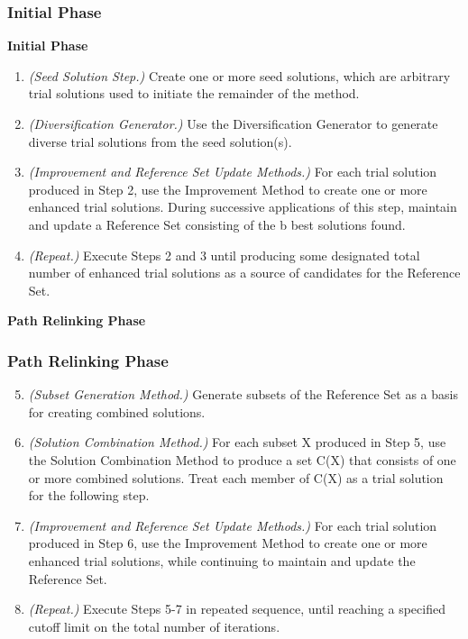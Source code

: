 \subsubsection{Initial Phase}
\textbf{Initial Phase}
\begin{enumerate}
\item \textit{(Seed Solution Step.)}
  Create one or more seed solutions, 
  which are arbitrary trial solutions
  used to initiate the remainder of the method.
\item \textit{(Diversification Generator.)}
  Use the Diversification Generator to 
  generate diverse trial solutions from the seed solution(s).
\item \textit{(Improvement and Reference Set Update Methods.)}
  For each trial solution produced in Step 2,
  use the Improvement Method to create one or more enhanced trial solutions.
  During successive applications of this step,
  maintain and update a Reference Set
  consisting of the b best solutions found.
\item \textit{(Repeat.)}
  Execute Steps 2 and 3 until 
  producing some designated total number of enhanced trial solutions
  as a source of candidates for the Reference Set.
\end{enumerate}
\newpage
\textbf{Path Relinking Phase}
\subsubsection{Path Relinking Phase}
\begin{enumerate}
  \setcounter{enumi}{4}
\item \textit{(Subset Generation Method.)}
  Generate subsets of the Reference Set 
  as a basis for creating combined solutions.
\item \textit{(Solution Combination Method.)}
  For each subset X produced in Step 5, 
  use the Solution Combination Method to produce a set C(X)
  that consists of one or more combined solutions. 
  Treat each member of C(X) as a trial solution for the following step.
\item \textit{(Improvement and Reference Set Update Methods.)}
  For each trial solution produced in Step 6, 
  use the Improvement Method to create one or more enhanced trial solutions, 
  while continuing to maintain and update the Reference Set.
\item \textit{(Repeat.)}
  Execute Steps 5-7 in repeated sequence,
  until reaching a specified cutoff limit on the total number of iterations.
\end{enumerate}

